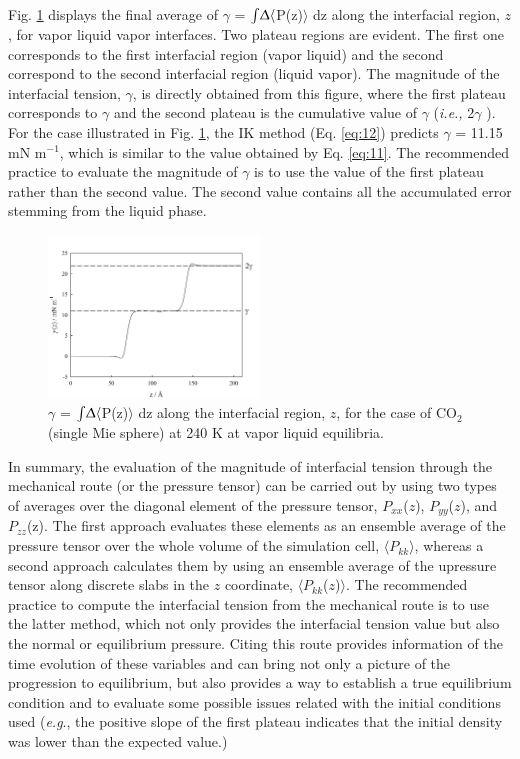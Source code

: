 \documentclass[9pt,tutorial]{livecoms}
\begin{document}
Fig. \ref{fig:18} displays the final average of ${\gamma}$
= ${\int}{\Updelta}{\langle}$P(z)${\rangle}$ dz along the interfacial
region, $z$, for vapor \textendash{} liquid \textendash{} vapor
interfaces. Two plateau regions are evident.
The first one corresponds to the first interfacial region (vapor \textendash{}
liquid) and the second correspond to the second interfacial region (liquid
\textendash{} vapor). The magnitude of the interfacial tension, ${\gamma}$, is
directly obtained from this figure, where the first plateau corresponds to
${\gamma}$ and the second plateau is the cumulative value of ${\gamma}$
(\textit{i.e.,} 2${\gamma}$ ). For the case illustrated in Fig. \ref{fig:18}, the IK
method (Eq. \ref{eq:12}) predicts ${\gamma}$ = 11.15 mN m$^{-1}$, which is similar to
the value obtained by Eq. \ref{eq:11}.
The recommended practice to evaluate the magnitude of ${\gamma}$ is to use the value
of the first plateau rather than the second value. The second value contains
all the accumulated error stemming from the liquid phase.
\begin{figure}
\includegraphics[width=0.5\textwidth]{gfx/image63.jpeg}
\caption{${\gamma}$ = ${\int}{\Updelta}{\langle}$P(z)${\rangle}$ dz along the interfacial region, $z$, for the case of CO$_{2}$ (single Mie sphere) at 240 K at vapor \textendash{} liquid equilibria.}
\label{fig:18}
\end{figure}

In summary, the evaluation of the magnitude of interfacial tension through the
mechanical route (or the pressure tensor) can be carried out by using two types
of averages over the diagonal element of the pressure tensor,
$P_{xx}$($z$), $P_{yy}$($z$), and
$P_{zz}$(z). The first approach evaluates these elements as an
ensemble average of the pressure tensor over the whole volume of the simulation
cell, ${\langle}P_{kk}{\rangle}$, whereas a second approach
calculates them by using an ensemble average of the upressure tensor along
discrete slabs in the $z$ coordinate,
${\langle}P_{kk}$($z$)${\rangle}$. The recommended practice to
compute the interfacial tension from the mechanical route is to use the latter 
method, which not only provides the interfacial tension value but also the
normal or equilibrium pressure. Citing \citet{holcomb1993} this route provides information of the time
evolution of these variables and can bring not only a picture of the
progression to equilibrium,  but also provides a way to establish a true
equilibrium condition and to evaluate some possible issues related with the
initial conditions used (\textit{e.g}., the positive slope of the first plateau
indicates that the initial density was lower than the expected value.) 
\end{document}
